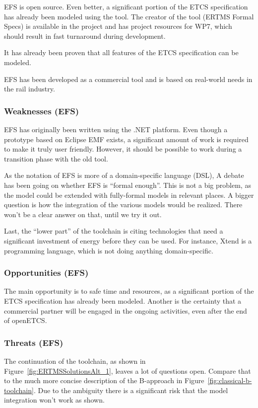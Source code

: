 EFS is open source.  Even better, a significant portion of the ETCS specification has already been modeled using the tool.  The creator of the tool (ERTMS Formal Specs) is available in the project and has project resources for WP7, which should result in fast turnaround during development.

It has already been proven that all features of the ETCS specification can be modeled.

EFS has been developed as a commercial tool and is based on real-world needs in the rail industry.

\subsubsection{Weaknesses (EFS)}

EFS has originally been written using the .NET platform.  Even though a prototype based on Eclipse EMF exists, a significant amount of work is required to make it truly user friendly.  However, it should be possible to work during a transition phase with the old tool.

As the notation of EFS is more of a domain-specific language (DSL), A debate has been going on whether EFS is ``formal enough''.  This is not a big problem, as the model could be extended with fully-formal models in relevant places.  A bigger question is how the integration of the various models would be realized.  There won't be a clear answer on that, until we try it out.

Last, the ``lower part'' of the toolchain is citing technologies that need a significant investment of energy before they can be used.  For instance, Xtend is a programming language, which is not doing anything domain-specific.

\subsubsection{Opportunities (EFS)}

The main opportunity is to safe time and resources, as a significant portion of the ETCS specification has already been modeled.  Another is the certainty that a commercial partner will be engaged in the ongoing activities, even after the end of openETCS.

\subsubsection{Threats (EFS)}

The continuation of the toolchain, as shown in Figure~\ref{fig:ERTMSSolutionsAlt_1}, leaves a lot of questions open.  Compare that to the much more concise description of the B-approach in Figure~\ref{fig:classical-b-toolchain}.  Due to the ambiguity there is a significant risk that the model integration won't work as shown.

